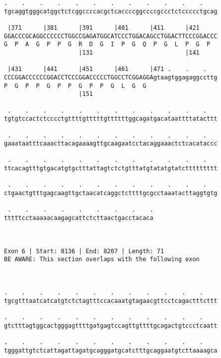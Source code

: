 \documentclass{article}
\begin{document}
\begin{Verbatim}
.    .    .    .    .    .    .    .    .    .    .    .    
tgcaggtgggcatggctctcggccccacgctcaccccggccccgccctctccccctgcag
                                                            
 |371      |381      |391      |401      |411      |421     
GGACCCGCAGGCCCCCCTGGCCGAGATGGCATCCCTGGACAGCCTGGACTTCCCGGACCC
G  P  A  G  P  P  G  R  D  G  I  P  G  Q  P  G  L  P  G  P  
                     |131                          |141     
  
 |431      |441      |451      |461      |471 .    .    .   
CCCGGACCCCCCGGACCTCCCGGACCCCCTGGCCTCGGAGGAgtaagtggagaggccttg
P  G  P  P  G  P  P  G  P  P  G  L  G  G                    
                     |151                                   
  
 .    .    .    .    .    .    .    .    .    .    .    .   
tgtgtccactctcccctgttttgtttttgttttttggcagatgacataattttatacttt
                                                            
 .    .    .    .    .    .    .    .    .    .    .    .   
gaaataatttcaaacttacagaaaagttgcaagaatcctacaggaaactctcacataccc
                                                            
 .    .    .    .    .    .    .    .    .    .    .    .   
ttcacagtttgtgacatgtgctttattagtctctgtttatgtatatgtatcttttttttt
                                                            
 .    .    .    .    .    .    .    .    .    .    .    .   
ctgaactgtttgagcaagttgctaacatcaggctcttttgcgcctaaatacttaggtgtg
                                                            
 .    .    .    .    .    .    .    .    .
tttttcctaaaaacaagagcattctcttaactgacctacaca
                                          
                                          
 
Exon 6 | Start: 8136 | End: 8207 | Length: 71
BE AWARE: This section overlaps with the following exon



.    .    .    .    .    .    .    .    .    .    .    .    
tgcgtttaatcatcatgtctctagtttccacaaatgtagaacgttcctcagactttcttt
                                                            
.    .    .    .    .    .    .    .    .    .    .    .    
gtctttagtggcactgggagttttgatgagtccagttgttttgcagactgtccctcaatt
                                                            
.    .    .    .    .    .    .    .    .    .    .    .    
tgggattgtctcattagattagatgcagggatgcatctttgcaggaatgtcttaaaagca
                                                            

\end{Verbatim}
\end{document}
